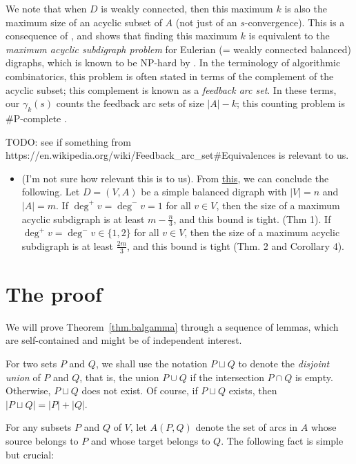 \documentclass[numbers=enddot,12pt,final,onecolumn,notitlepage]{scrartcl}%
\theoremstyle{definition}
\theoremstyle{plainsl}
\begin{document}
\begin{enumerate}
We note that when $D$ is weakly connected, then this maximum $k$ is also the
maximum size of an acyclic subset of $A$ (not just of an $s$-convergence).
This is a consequence of \cite[Theorem 3.4]{PerPha15}, and shows that finding
this maximum $k$ is equivalent to the \emph{maximum acyclic subdigraph
problem} for Eulerian (= weakly connected balanced) digraphs, which is known
to be NP-hard by \cite[Theorem 3.10]{PerPha15}. In the terminology of
algorithmic combinatorics, this problem is often stated in terms of the
complement of the acyclic subset; this complement is known as a \emph{feedback
arc set}. In these terms, our $\gamma_{k}\left(  s\right)  $ counts the
feedback arc sets of size $\left\vert A\right\vert -k$; this counting problem
is \#P-complete \cite[Theorem 5]{Perrot19}.

TODO: see if something from
https://en.wikipedia.org/wiki/Feedback\_arc\_set\#Equivalences is relevant to us.

\begin{itemize}
    \item (I'm not sure how relevant this is to us). From \href{https://link.springer.com/chapter/10.1007/978-3-642-45043-3_26}{this}, we can conclude the following. Let $D = (V,A)$ be a simple balanced digraph with $|V| = n$ and $|A| = m$. If $\deg^+v = \deg^- v = 1$ for all $v \in V$, then the size of a maximum acyclic subdigraph is at least $m-\frac{n}{3}$, and this bound is tight. (Thm 1). If $\deg^+v = \deg^- v \in \{1,2\}$ for all $v \in V$, then the size of a maximum acyclic subdigraph is at least $\frac{2m}{3}$, and this bound is tight (Thm. 2 and Corollary 4).
\end{itemize}
\end{enumerate}

\section{The proof}

We will prove Theorem~\ref{thm.balgamma} through a sequence of lemmas, which
are self-contained and might be of independent interest.

For two sets $P$ and $Q$, we shall use the notation $P\sqcup Q$ to denote the
\emph{disjoint union} of $P$ and $Q$, that is, the union $P\cup Q$ if the
intersection $P\cap Q$ is empty. Otherwise, $P\sqcup Q$ does not exist. Of
course, if $P\sqcup Q$ exists, then $\left\vert P\sqcup Q\right\vert
=\left\vert P\right\vert +\left\vert Q\right\vert $.

For any subsets $P$ and $Q$ of $V$, let $A(P,Q)$ denote the set of arcs in $A$
whose source belongs to $P$ and whose target belongs to $Q$. The following
fact is simple but crucial:
\end{document}
